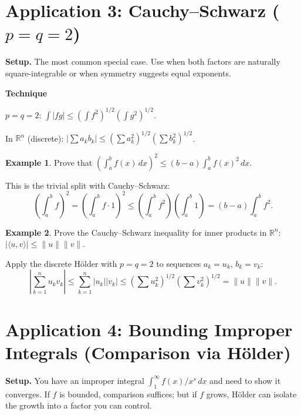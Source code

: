 \documentclass[11pt]{article}
\newcommand{\R}{\mathbb{R}}
\theoremstyle{myplain}
\theoremstyle{definition}
\newtheorem{example}{Example}
\theoremstyle{remark}
\newenvironment{technique}{%
  \par\smallskip
  \noindent\colorbox{Apricot}{\textbf{Technique}}\enspace\ignorespaces
}{\par\smallskip}
\begin{document}
\section{Application 3: Cauchy--Schwarz ($p = q = 2$)}

\textbf{Setup.} The most common special case. Use when both factors are naturally square-integrable or when symmetry suggests equal exponents.

\begin{technique}
$p = q = 2$: $\displaystyle\int |fg| \leq \left(\int f^2\right)^{1/2}\!\left(\int g^2\right)^{1/2}$.

In $\R^n$ (discrete): $\left|\sum a_k b_k\right| \leq \left(\sum a_k^2\right)^{1/2}\!\left(\sum b_k^2\right)^{1/2}$.
\end{technique}

\begin{example}
Prove that $\left(\int_a^b f(x)\,dx\right)^2 \leq (b-a)\int_a^b f(x)^2\,dx$.

This is the trivial split with Cauchy--Schwarz:
\[
  \left(\int_a^b f\right)^2 = \left(\int_a^b f \cdot 1\right)^2 \leq \left(\int_a^b f^2\right)\!\left(\int_a^b 1\right) = (b-a)\int_a^b f^2.
\]
\end{example}

\begin{example}
Prove the Cauchy--Schwarz inequality for inner products in $\R^n$: $|\langle u, v\rangle| \leq \|u\|\|v\|$.

Apply the discrete H\"{o}lder with $p=q=2$ to sequences $a_k = u_k$, $b_k = v_k$:
\[
  \left|\sum_{k=1}^n u_k v_k\right| \leq \sum_{k=1}^n |u_k||v_k| \leq \left(\sum u_k^2\right)^{1/2}\!\left(\sum v_k^2\right)^{1/2} = \|u\|\|v\|.
\]
\end{example}

\section{Application 4: Bounding Improper Integrals (Comparison via H\"{o}lder)}

\textbf{Setup.} You have an improper integral $\int_1^\infty f(x)/x^s\,dx$ and need to show it converges. If $f$ is bounded, comparison suffices; but if $f$ grows, H\"{o}lder can isolate the growth into a factor you can control.
\end{document}
